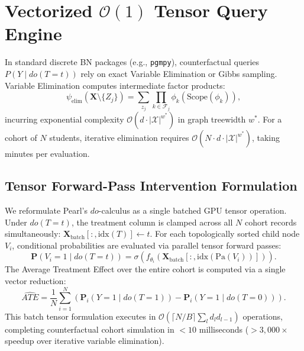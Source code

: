 \section{Vectorized $\mathcal{O}(1)$ Tensor Query Engine}
\label{sec:meth_tensor_engine}

In standard discrete BN packages (e.g., \texttt{pgmpy}), counterfactual queries $P(Y \mid do(T=t))$ rely on exact Variable Elimination or Gibbs sampling. Variable Elimination computes intermediate factor products:
\begin{equation}
    \psi_{\text{elim}}(\mathbf{X} \setminus \{Z_j\}) = \sum_{z_j} \prod_{k \in \mathcal{F}_j} \phi_k(\text{Scope}(\phi_k)),
    \label{eq:var_elim_factor}
\end{equation}
incurring exponential complexity $\mathcal{O}(d \cdot |\mathcal{X}|^{w^*})$ in graph treewidth $w^*$. For a cohort of $N$ students, iterative elimination requires $\mathcal{O}(N \cdot d \cdot |\mathcal{X}|^{w^*})$, taking minutes per evaluation.

\subsection{Tensor Forward-Pass Intervention Formulation}

We reformulate Pearl's $do$-calculus as a single batched GPU tensor operation. Under $do(T=t)$, the treatment column is clamped across all $N$ cohort records simultaneously: $\mathbf{X}_{\text{batch}}[:, \text{idx}(T)] \leftarrow t$. For each topologically sorted child node $V_i$, conditional probabilities are evaluated via parallel tensor forward passes:
\begin{equation}
    \mathbf{P}(V_i = 1 \mid do(T=t)) = \sigma\left( f_{\theta_i}\left( \mathbf{X}_{\text{batch}}[:, \text{idx}(\text{Pa}(V_i))] \right) \right).
    \label{eq:vectorized_do_op}
\end{equation}
The Average Treatment Effect over the entire cohort is computed via a single vector reduction:
\begin{equation}
    \widehat{ATE} = \frac{1}{N} \sum_{i=1}^N \left( \mathbf{P}_i(Y = 1 \mid do(T=1)) - \mathbf{P}_i(Y = 1 \mid do(T=0)) \right).
    \label{eq:vectorized_ate_reduction}
\end{equation}
This batch tensor formulation executes in $\mathcal{O}\left( \lceil N/B \rceil \sum_l d_l d_{l-1} \right)$ operations, completing counterfactual cohort simulation in $<10$ milliseconds ($>3,000\times$ speedup over iterative variable elimination).

